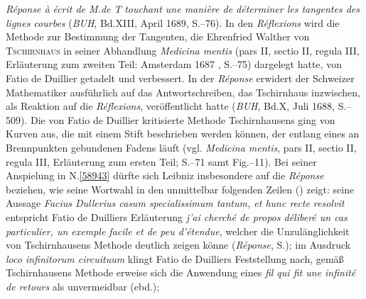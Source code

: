 \textit{Réponse à} \textit{écrit de M.\;de T} \textit{touchant une manière de déterminer les tangentes des lignes courbes} (\textit{BUH}, Bd.\;XIII, April 1689, S.--76).\cite{02540}\cite{02545}
In den \textit{Réflexions}\cite{02539} wird die Methode zur Bestimmung der Tangenten, die Ehrenfried Walther von \textsc{Tschirnhaus} in seiner Abhandlung \textit{Medicina mentis} (pars II, sectio II, regula III, Erläuterung zum zweiten Teil: Amsterdam 1687 , S.--75)\cite{02542} dargelegt hatte, von Fatio de Duillier getadelt und verbessert.
In der \textit{Réponse}\cite{02540} erwidert der Schweizer Mathematiker ausführlich auf das Antwortschreiben, das Tschirnhaus inzwischen, als Reaktion auf die \textit{Réflexions}, veröffentlicht hatte (\textit{BUH}, Bd.\;X, Juli 1688, S.--509).\cite{02453}
Die von Fatio de Duillier kritisierte Methode Tschirnhausens ging von Kurven aus, die mit einem Stift beschrieben werden können, der entlang eines an Brennpunkten gebundenen Fadens läuft (vgl. \textit{Medicina mentis}, pars II, sectio II, regula III, Erläuterung zum ersten Teil; S.--71 samt Fig.--11).\cite{02542} %
Bei seiner Anspielung in N.\;\ref{58943} dürfte sich Leibniz insbesondere auf die \textit{Réponse}\cite{02540} beziehen, wie seine Wortwahl in den unmittelbar folgenden Zeilen () zeigt:
seine Aussage \textit{Facius Dullerius casum specialissimum tantum, et hunc recte resolvit} entspricht Fatio de Duilliers Erläuterung \textit{j'ai cherché de propos déliberé un cas particulier, un exemple facile et de peu d'étendue}, welcher die Unzulänglichkeit von Tschirnhausens Methode deutlich zeigen könne (\textit{Réponse}, S.);\cite{02540}
im Ausdruck \textit{loco infinitorum circuituum} klingt Fatio de Duilliers Feststellung nach, gemäß Tschirnhausens Methode erweise sich die Anwendung eines \textit{fil qui fit une infinité de retours} als unvermeidbar (ebd.);\cite{02540}
